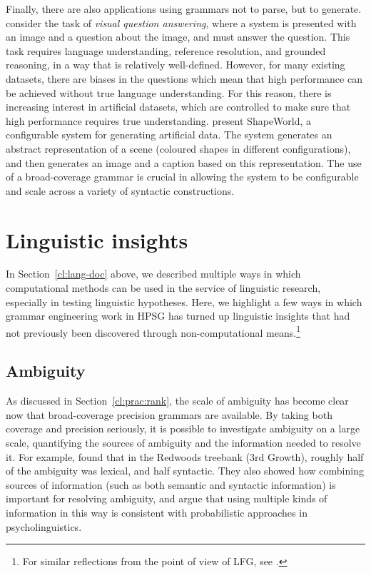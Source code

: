 \documentclass[output=paper,nonflat]{langsci/langscibook}
\begin{document}
Finally, there are also applications using grammars not to parse, but to generate.
\citet{kuhnle2018shapeworld} consider the task of \textit{visual question answering},
where a system is presented with an image and a question about the image,
and must answer the question.
This task requires language understanding, reference resolution, and grounded reasoning,
in a way that is relatively well-defined.
However, for many existing datasets, there are biases in the questions
which mean that high performance can be achieved without true language understanding.
For this reason, there is increasing interest in artificial datasets,
which are controlled to make sure that high performance requires true understanding.
\citeauthor{kuhnle2018shapeworld} present ShapeWorld,
a configurable system for generating artificial data.
The system generates an abstract representation of a scene
(coloured shapes in different configurations),
and then generates an image and a caption based on this representation.
The use of a broad-coverage grammar is crucial
in allowing the system to be configurable
and scale across a variety of syntactic constructions.




\section{Linguistic insights}
\label{cl:insight}

In Section~\ref{cl:lang-doc} above, we described multiple ways in which computational methods can be used in the service of linguistic research, especially in testing linguistic hypotheses. Here, we highlight a few ways in which grammar engineering work in HPSG has turned up linguistic insights that had not previously been discovered through non-computational means.\footnote{For similar reflections from the point of view of LFG, see \cite{King:16}.}

\subsection{Ambiguity} %

As discussed in Section~\ref{cl:prac:rank},
the scale of ambiguity has become clear now that broad-coverage precision grammars are available.
By taking both coverage and precision seriously,
it is possible to investigate ambiguity on a large scale,
quantifying the sources of ambiguity and the information needed to resolve it.
For example, \citet{Tou:Man:Shi:Fli:Oep:02,Tou:Man:Fli:Oep:05}
found that in the Redwoods treebank (3rd Growth),
roughly half of the ambiguity was lexical, and half syntactic.
They also showed how combining sources of information
(such as both semantic and syntactic information)
is important for resolving ambiguity,
and argue that using multiple kinds of information in this way is consistent with probabilistic approaches in psycholinguistics.
\end{document}
